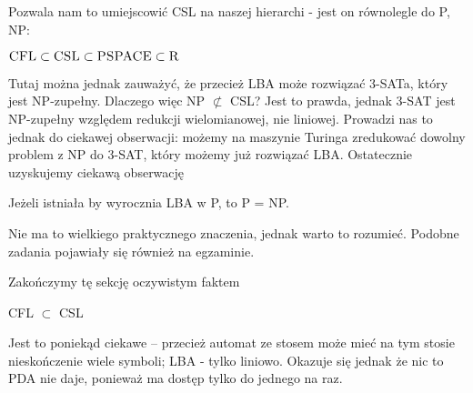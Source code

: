 Pozwala nam to umiejscowić CSL na naszej hierarchi - jest on równolegle do P, NP:

\begin{corollary}
    \( \textsc{CFL} \subset \textsc{CSL} \subset \textsc{PSPACE} \subset \textsc{R} \)
\end{corollary}

Tutaj można jednak zauważyć, że przecież LBA może rozwiązać 3-SATa, który jest NP-zupełny. Dlaczego więc NP \( \not \subset \) CSL? Jest to prawda,
jednak 3-SAT jest NP-zupełny względem redukcji wielomianowej, nie liniowej. Prowadzi nas to jednak do ciekawej obserwacji: możemy na maszynie Turinga
zredukować dowolny problem z NP do 3-SAT, który możemy już rozwiązać LBA. Ostatecznie uzyskujemy ciekawą obserwację

\begin{corollary}
    Jeżeli istniała by wyrocznia LBA w P, to P = NP.
\end{corollary}

Nie ma to wielkiego praktycznego znaczenia, jednak warto to rozumieć. Podobne zadania pojawiały się również na egzaminie.

Zakończymy tę sekcję oczywistym faktem

\begin{lemma}
    CFL \(\subset\) CSL
\end{lemma}

Jest to poniekąd ciekawe -- przecież automat ze stosem może mieć na tym stosie nieskończenie wiele symboli; LBA - tylko liniowo. Okazuje się jednak że
nic to PDA nie daje, ponieważ ma dostęp tylko do jednego na raz.